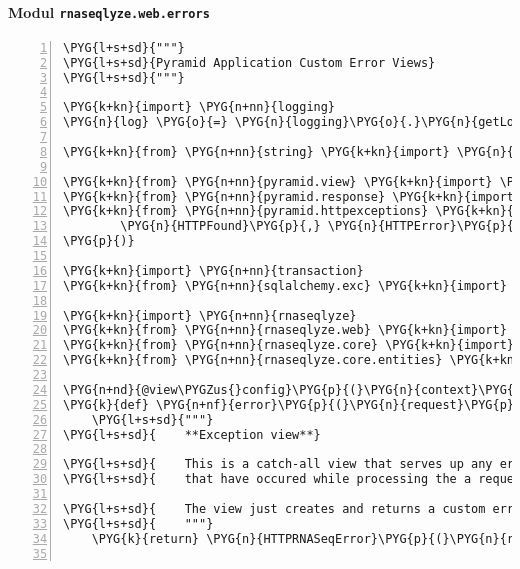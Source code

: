 \paragraph{Modul \texttt{rnaseqlyze.web.errors}}
\label{rnaseqlyze-pdf:modul-rnaseqlyze-web-errors}
\begin{Verbatim}[commandchars=\\\{\},numbers=left,firstnumber=1,stepnumber=5]
\PYG{l+s+sd}{"""}
\PYG{l+s+sd}{Pyramid Application Custom Error Views}
\PYG{l+s+sd}{"""}

\PYG{k+kn}{import} \PYG{n+nn}{logging}
\PYG{n}{log} \PYG{o}{=} \PYG{n}{logging}\PYG{o}{.}\PYG{n}{getLogger}\PYG{p}{(}\PYG{n}{\PYGZus{}\PYGZus{}name\PYGZus{}\PYGZus{}}\PYG{p}{)}

\PYG{k+kn}{from} \PYG{n+nn}{string} \PYG{k+kn}{import} \PYG{n}{Template}

\PYG{k+kn}{from} \PYG{n+nn}{pyramid.view} \PYG{k+kn}{import} \PYG{n}{view\PYGZus{}config}
\PYG{k+kn}{from} \PYG{n+nn}{pyramid.response} \PYG{k+kn}{import} \PYG{n}{Response}\PYG{p}{,} \PYG{n}{FileResponse}
\PYG{k+kn}{from} \PYG{n+nn}{pyramid.httpexceptions} \PYG{k+kn}{import} \PYG{p}{(}
        \PYG{n}{HTTPFound}\PYG{p}{,} \PYG{n}{HTTPError}\PYG{p}{,} \PYG{n}{HTTPServiceUnavailable}\PYG{p}{,} \PYG{n}{HTTPInternalServerError}
\PYG{p}{)}

\PYG{k+kn}{import} \PYG{n+nn}{transaction}
\PYG{k+kn}{from} \PYG{n+nn}{sqlalchemy.exc} \PYG{k+kn}{import} \PYG{n}{DBAPIError}

\PYG{k+kn}{import} \PYG{n+nn}{rnaseqlyze}
\PYG{k+kn}{from} \PYG{n+nn}{rnaseqlyze.web} \PYG{k+kn}{import} \PYG{n}{DBSession}\PYG{p}{,} \PYG{n}{DBSession\PYGZus{}unmanaged}
\PYG{k+kn}{from} \PYG{n+nn}{rnaseqlyze.core} \PYG{k+kn}{import} \PYG{n}{service}
\PYG{k+kn}{from} \PYG{n+nn}{rnaseqlyze.core.entities} \PYG{k+kn}{import} \PYG{n}{Analysis}

\PYG{n+nd}{@view\PYGZus{}config}\PYG{p}{(}\PYG{n}{context}\PYG{o}{=}\PYG{n+ne}{Exception}\PYG{p}{)}
\PYG{k}{def} \PYG{n+nf}{error}\PYG{p}{(}\PYG{n}{request}\PYG{p}{)}\PYG{p}{:}
    \PYG{l+s+sd}{"""}
\PYG{l+s+sd}{    **Exception view**}

\PYG{l+s+sd}{    This is a catch-all view that serves up any errors}
\PYG{l+s+sd}{    that have occured while processing the a request.}

\PYG{l+s+sd}{    The view just creates and returns a custom error response object.}
\PYG{l+s+sd}{    """}
    \PYG{k}{return} \PYG{n}{HTTPRNASeqError}\PYG{p}{(}\PYG{n}{request}\PYG{o}{.}\PYG{n}{exc\PYGZus{}info}\PYG{p}{)}


\end{Verbatim}
